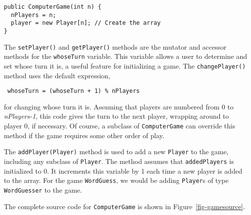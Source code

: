 \begin{jjjlisting}
\begin{lstlisting}
public ComputerGame(int n) {
  nPlayers = n;
  player = new Player[n]; // Create the array
}
\end{lstlisting}
\end{jjjlisting}

\noindent The {\tt setPlayer()} and {\tt getPlayer()} methods are the
mutator and accessor methods for the {\tt whoseTurn} variable. This variable
allows a user to determine and set whose turn it is, a useful feature
for initializing a game.  The {\tt changePlayer()} method uses the default
expression, 

\begin{jjjlisting}
\begin{lstlisting}
 whoseTurn = (whoseTurn + 1) % nPlayers 
\end{lstlisting}
\end{jjjlisting}

\noindent for changing whose turn it is.  Assuming that players are
numbered from 0 to {\em nPlayers-1}, this code gives the turn to the
next player, wrapping around to player 0, if necessary. Of course, a
subclass of {\tt ComputerGame} can override this method if the game
requires some other order of play.

The {\tt addPlayer(Player)} method is used to add a new {\tt Player}
to the game, including any subclass of {\tt Player}.  The
method assumes that {\tt addedPlayers} is initialized to 0. It
increments this variable by 1 each time a new player is added to the
array. For the game {\tt WordGuess}, we would be adding {\tt Player}s
of type {\tt WordGuesser} to the game.

The complete source code for {\tt ComputerGame} is shown in
Figure~\ref{fig-gamesource}.

